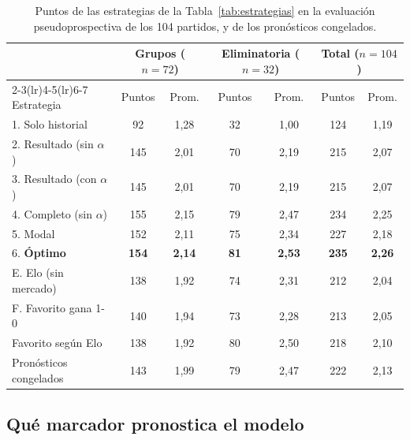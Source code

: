 \documentclass[12pt]{article}
\theoremstyle{plain}
\theoremstyle{remark}
\begin{document}
\begin{table}[!htb]
\centering
\caption{Puntos de las estrategias de la Tabla~\ref{tab:estrategias}
en la evaluación pseudoprospectiva de los 104 partidos, y de los
pronósticos congelados.}
\label{tab:ablacion}
\small
\begin{tabular}{lcccccc}
\toprule
& \multicolumn{2}{c}{Grupos ($n=72$)}
& \multicolumn{2}{c}{Eliminatoria ($n=32$)}
& \multicolumn{2}{c}{Total ($n=104$)} \\
\cmidrule(lr){2-3}\cmidrule(lr){4-5}\cmidrule(lr){6-7}
Estrategia & Puntos & Prom. & Puntos & Prom. & Puntos & Prom. \\
\midrule
1. Solo historial            &  92 & 1,28 & 32 & 1,00 & 124 & 1,19 \\
2. Resultado (sin $\alpha$)  & 145 & 2,01 & 70 & 2,19 & 215 & 2,07 \\
3. Resultado (con $\alpha$)  & 145 & 2,01 & 70 & 2,19 & 215 & 2,07 \\
4. Completo (sin $\alpha$)   & 155 & 2,15 & 79 & 2,47 & 234 & 2,25 \\
5. Modal                     & 152 & 2,11 & 75 & 2,34 & 227 & 2,18 \\
6. \textbf{Óptimo}           & \textbf{154} & \textbf{2,14} & \textbf{81} & \textbf{2,53} & \textbf{235} & \textbf{2,26} \\
\midrule
E. Elo (sin mercado)         & 138 & 1,92 & 74 & 2,31 & 212 & 2,04 \\
F. Favorito gana 1-0         & 140 & 1,94 & 73 & 2,28 & 213 & 2,05 \\
\phantom{F. }Favorito según Elo & 138 & 1,92 & 80 & 2,50 & 218 & 2,10 \\
Pronósticos congelados       & 143 & 1,99 & 79 & 2,47 & 222 & 2,13 \\
\bottomrule
\end{tabular}
\end{table}

\FloatBarrier
\subsection{Qué marcador pronostica el modelo}
\label{sec:mapa}
\end{document}
